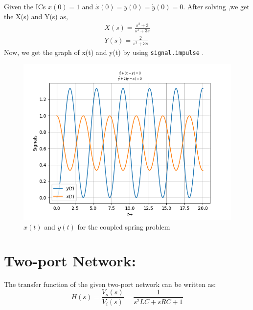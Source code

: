\documentclass[11pt, a4paper]{article}
\begin{document}
    Given the ICs $x(0)=1$ and $\dot{x}(0)=y(0)=\dot{y}(0)=0$. After solving ,we get the X(s) and Y(s) as,
    \begin{gather*}
        X(s) = \frac{s^2+3}{s^3+3s}\\
        Y(s) = \frac{2}{s^3+3s}
    \end{gather*}
    Now, we get the graph of x(t) and y(t) by using \texttt{signal.impulse} .
    \begin{figure}[H]
        \centering
        \includegraphics[scale=0.7]{Figure_4.png}
        \caption{$x(t)$ and $y(t)$ for the coupled spring problem}
        \label{fig:Fig4}
    \end{figure}

\section{Two-port Network:}
    The transfer function of the given two-port network can be written as:
    \begin{equation*}
        H(s)= \frac{V_o(s)}{V_i(s)} = \frac{1}{s^2LC+sRC+1}
    \end{equation*}
\end{document}
